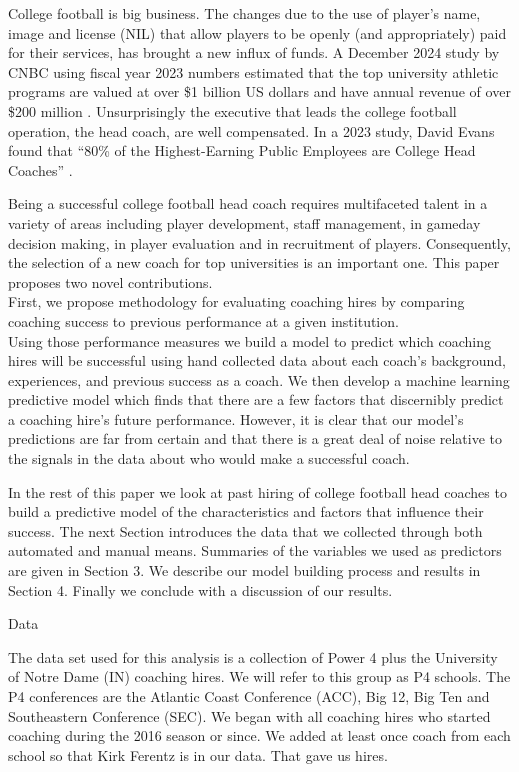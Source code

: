\documentclass[
  12pt]{article}
\begin{document}
College football is big business. The changes due to the use of player's
name, image and license (NIL) that allow players to be openly (and
appropriately) paid for their services, has brought a new influx of
funds. A December 2024 study by CNBC using fiscal year 2023 numbers
estimated that the top university athletic programs are valued at over
\$1 billion US dollars and have annual revenue of over \$200 million
\citep{cnbc_college_worth}. Unsurprisingly the executive that leads the
college football operation, the head coach, are well compensated. In a
2023 study, David Evans found that ``80\% of the Highest-Earning Public
Employees are College Head Coaches'' \citep{highest_state}.

Being a successful college football head coach requires multifaceted
talent in a variety of areas including player development, staff
management, in gameday decision making, in player evaluation and in
recruitment of players. Consequently, the selection of a new coach for
top universities is an important one. This paper proposes two novel
contributions.\\
First, we propose methodology for evaluating coaching hires by comparing
coaching success to previous performance at a given institution.\\
Using those performance measures we build a model to predict which
coaching hires will be successful using hand collected data about each
coach's background, experiences, and previous success as a coach. We
then develop a machine learning predictive model which finds that there
are a few factors that discernibly predict a coaching hire's future
performance. However, it is clear that our model's predictions are far
from certain and that there is a great deal of noise relative to the
signals in the data about who would make a successful coach.

In the rest of this paper we look at past hiring of college football
head coaches to build a predictive model of the characteristics and
factors that influence their success. The next Section introduces the
data that we collected through both automated and manual means.
Summaries of the variables we used as predictors are given in Section 3.
We describe our model building process and results in Section 4. Finally
we conclude with a discussion of our results.

Data

The data set used for this analysis is a collection of Power 4 plus the
University of Notre Dame (IN) coaching hires. We will refer to this
group as P4 schools. The P4 conferences are the Atlantic Coast
Conference (ACC), Big 12, Big Ten and Southeastern Conference (SEC). We
began with all coaching hires who started coaching during the 2016
season or since. We added at least once coach from each school so that
Kirk Ferentz is in our data. That gave us hires.
\end{document}
